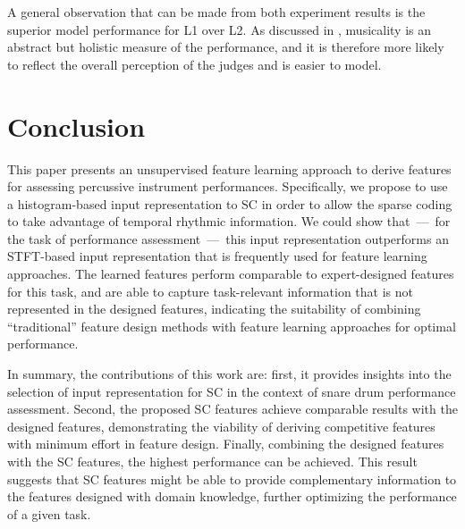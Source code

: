 \documentclass[conference]{IEEEtran}
\begin{document}
A general observation that can be made from both experiment results is the superior model performance for L1 over L2. As discussed in \cite{Wu2016}, musicality is an abstract but holistic measure of the performance, and it is therefore more likely to reflect the overall perception of the judges and is easier to model. %

\section{Conclusion}\label{sec:conclusion}
This paper presents an unsupervised feature learning approach to derive features for assessing percussive instrument performances. Specifically, we propose to use a histogram-based input representation to SC in order to allow the sparse coding to take advantage of temporal rhythmic information. We could show that~---~for the task of performance assessment~---~this input representation outperforms an STFT-based input representation that is frequently used for feature learning approaches. The learned features perform comparable to expert-designed features for this task, and are able to capture task-relevant information that is not represented in the designed features, indicating the suitability of combining ``traditional'' feature design methods with feature learning approaches for optimal performance.

In summary, the contributions of this work are: 
first, it provides insights into the selection of input representation for SC in the context of snare drum performance assessment. 
Second, the proposed SC features achieve comparable results with the designed features, demonstrating the viability of deriving competitive features with minimum effort in feature design. 
Finally, combining the designed features with the SC features, the highest performance can be achieved. This result suggests that SC features might be able to provide complementary information to the features designed with domain knowledge, further optimizing the performance of a given task. 
\end{document}
